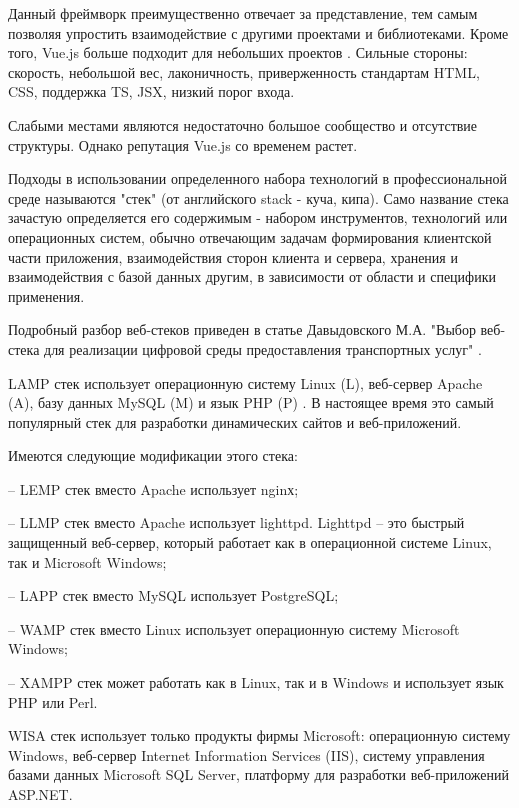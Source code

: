 Данный фреймворк преимущественно отвечает за представление, тем самым позволяя упростить
взаимодействие с другими проектами и библиотеками.
Кроме того, Vue.js больше подходит для небольших проектов \cite{sergacheva-framework-4}.
Сильные стороны: скорость, небольшой вес, лаконичность, приверженность стандартам HTML, CSS, поддержка TS, JSX, низкий порог входа.

Слабыми местами являются недостаточно большое сообщество и отсутствие структуры.
Однако репутация Vue.js со временем растет.


Подходы в использовании определенного набора технологий в профессиональной среде называются "стек" (от английского stack - куча, кипа).
Само название стека зачастую определяется его содержимым - набором инструментов, технологий или операционных систем, обычно отвечающим  задачам формирования клиентской части приложения, взаимодействия сторон клиента и сервера, хранения и взаимодействия с базой данных другим, в зависимости от области и специфики применения.


Подробный разбор веб-стеков приведен в статье Давыдовского М.А. "Выбор веб-стека для реализации цифровой среды предоставления транспортных услуг" \cite{davidovsky-vibor}.


LAMP стек \cite{davidovsky-vibor-1} использует операционную систему Linux (L), веб-сервер Apache (A), базу данных MySQL (M) и язык PHP (P) \cite{davidovsky-vibor-php}.
В настоящее время это самый популярный стек для разработки динамических сайтов и веб-приложений.

Имеются следующие модификации этого стека: 

-- LEMP стек вместо Apache использует nginх;

-- LLMP стек вместо Apache использует lighttpd. Lighttpd -- это быстрый защищенный веб-сервер, который работает как в операционной системе Linux, так и Microsoft Windows;

-- LAPP стек вместо MySQL использует PostgreSQL;

-- WAMP стек вместо Linux использует операционную систему Microsoft Windows;

-- XAMPP стек может работать как в Linux, так и в Windows и использует язык PHP или Perl.


WISA стек использует только продукты фирмы Microsoft: операционную систему Windows, веб-сервер Internet Information Services (IIS), систему управления базами данных Microsoft SQL Server, платформу для разработки веб-приложений ASP.NET.

